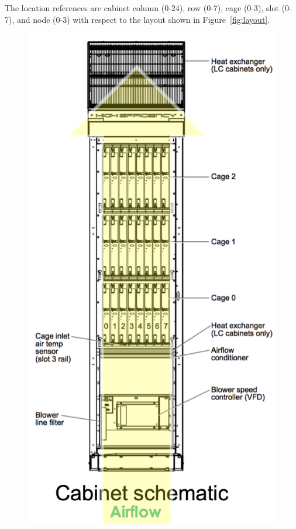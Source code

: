 The location references are cabinet column (0-24), row (0-7), cage
(0-3), slot (0-7), and node (0-3) with respect to the layout shown in
Figure~\ref{fig:layout}.
\begin{figure}
  \centering
  \begin{minipage}{0.49\columnwidth}
    \includegraphics[width=\columnwidth]{figs/TitanCabinet.png}

\end{minipage}
\end{figure}
